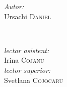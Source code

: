 \begin{titlepage}
\begin{center}
      \begin{minipage}{0.4\textwidth}
      \begin{flushleft} \large
      \emph{Autor:}\\
      Ursachi \textsc{Daniel}
      \end{flushleft}
      \end{minipage}
      ~
      \begin{minipage}{0.4\textwidth}
      \begin{flushright} \large
      \emph{lector asistent:} \\
      Irina \textsc{Cojanu} \\ %
      \emph{lector superior:} \\
      Svetlana \textsc{Cojocaru} %
      \end{flushright}
      \end{minipage}\\[4cm]

      \vspace{5 mm}






      \vfill %
      \end{center}
      
\end{titlepage}


